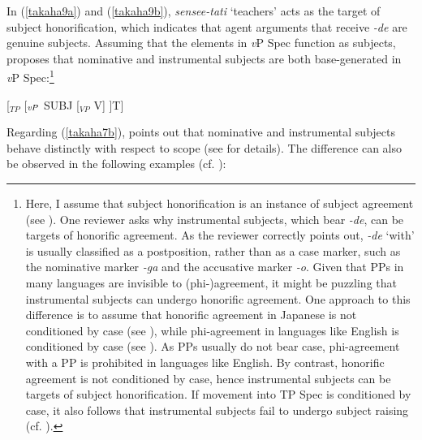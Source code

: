 \documentclass[output=paper]{langscibook}
\begin{document}
In (\ref{takaha9a}) and (\ref{takaha9b}), \emph{sensee-tati} ‘teachers’ acts as the target of subject honorification, which indicates that agent arguments that receive \emph{-de} are genuine subjects. Assuming that the elements in \emph{v}P Spec function as subjects, \citet{Kishimoto2010} proposes that nominative and instrumental subjects are both base-generated in \emph{v}P Spec:\footnote{Here, I assume that subject honorification is an instance of subject agreement (see \citealt{Ura1999, Takano2011, Kishimoto2012}). One reviewer asks why instrumental subjects, which bear \emph{-de}, can be targets of honorific agreement. As the reviewer correctly points out, \emph{-de} ‘with’ is usually classified as a postposition, rather than as a case marker, such as the nominative marker \emph{-ga} and the accusative marker \emph{-o}. Given that PPs in many languages are invisible to (phi-)agreement, it might be puzzling that instrumental subjects can undergo honorific agreement. One approach to this difference is to assume that honorific agreement in Japanese is not conditioned by case (see \citealt{Kishimoto2012}), while phi-agreement in languages like English is conditioned by case (see \citealt{Chomsky2000}). As PPs usually do not bear case, phi-agreement with a PP is prohibited in languages like English. By contrast, honorific agreement is not conditioned by case, hence instrumental subjects can be targets of subject honorification. If movement into TP Spec is conditioned by case, it also follows that instrumental subjects fail to undergo subject raising (cf. \citealt{Kishimoto2010}).} 

\begin{exe}
\ex \label{takaha10}
[$_{TP}$ \hspace{3mm}[$_{\emph{v}P}$ \hspace{3mm} SUBJ \hspace{3mm} [$_{VP}$ V]\hspace{1mm} ]\hspace{1mm}T]
\end{exe}

Regarding (\ref{takaha7b}), \citet{Kishimoto2010} points out that nominative and instrumental subjects behave distinctly with respect to scope (see \citealt{Kishimoto2010} for details). The difference can also be observed in the following examples (cf. \citealt{Kitaoka2014}):
\end{document}
